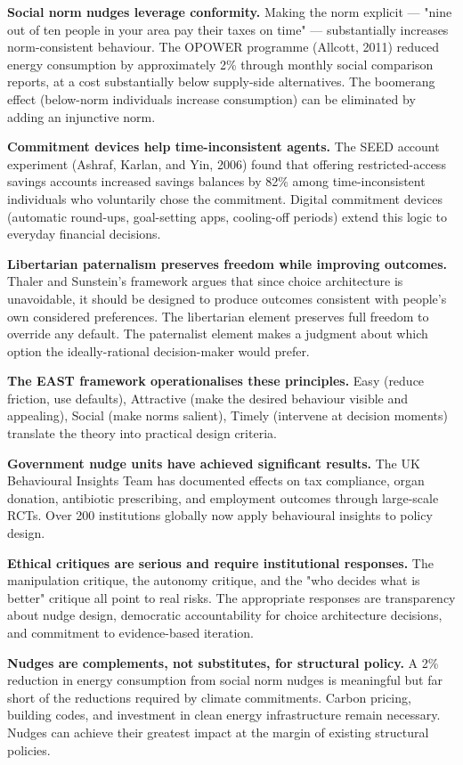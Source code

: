 \documentclass[12pt, letterpaper]{article}
\begin{document}
\textbf{Social norm nudges leverage conformity.} Making the norm explicit --- "nine out of ten people in your area pay their taxes on time" --- substantially increases norm-consistent behaviour. The OPOWER programme (Allcott, 2011) reduced energy consumption by approximately 2\% through monthly social comparison reports, at a cost substantially below supply-side alternatives. The boomerang effect (below-norm individuals increase consumption) can be eliminated by adding an injunctive norm.

\textbf{Commitment devices help time-inconsistent agents.} The SEED account experiment (Ashraf, Karlan, and Yin, 2006) found that offering restricted-access savings accounts increased savings balances by 82\% among time-inconsistent individuals who voluntarily chose the commitment. Digital commitment devices (automatic round-ups, goal-setting apps, cooling-off periods) extend this logic to everyday financial decisions.

\textbf{Libertarian paternalism preserves freedom while improving outcomes.} Thaler and Sunstein's framework argues that since choice architecture is unavoidable, it should be designed to produce outcomes consistent with people's own considered preferences. The libertarian element preserves full freedom to override any default. The paternalist element makes a judgment about which option the ideally-rational decision-maker would prefer.

\textbf{The EAST framework operationalises these principles.} Easy (reduce friction, use defaults), Attractive (make the desired behaviour visible and appealing), Social (make norms salient), Timely (intervene at decision moments) translate the theory into practical design criteria.

\textbf{Government nudge units have achieved significant results.} The UK Behavioural Insights Team has documented effects on tax compliance, organ donation, antibiotic prescribing, and employment outcomes through large-scale RCTs. Over 200 institutions globally now apply behavioural insights to policy design.

\textbf{Ethical critiques are serious and require institutional responses.} The manipulation critique, the autonomy critique, and the "who decides what is better" critique all point to real risks. The appropriate responses are transparency about nudge design, democratic accountability for choice architecture decisions, and commitment to evidence-based iteration.

\textbf{Nudges are complements, not substitutes, for structural policy.} A 2\% reduction in energy consumption from social norm nudges is meaningful but far short of the reductions required by climate commitments. Carbon pricing, building codes, and investment in clean energy infrastructure remain necessary. Nudges can achieve their greatest impact at the margin of existing structural policies.
\end{document}
